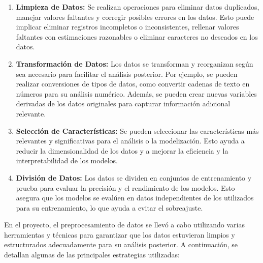 \documentclass[12pt]{article}
\begin{document}
\begin{enumerate}
    \item \textbf{Limpieza de Datos:} Se realizan operaciones para eliminar datos duplicados, manejar valores faltantes y corregir posibles errores en los datos. Esto puede implicar eliminar registros incompletos o inconsistentes, rellenar valores faltantes con estimaciones razonables o eliminar caracteres no deseados en los datos.
    \item \textbf{Transformación de Datos:} Los datos se transforman y reorganizan según sea necesario para facilitar el análisis posterior. Por ejemplo, se pueden realizar conversiones de tipos de datos, como convertir cadenas de texto en números para su análisis numérico. Además, se pueden crear nuevas variables derivadas de los datos originales para capturar información adicional relevante.
    \item \textbf{Selección de Características:} Se pueden seleccionar las características más relevantes y significativas para el análisis o la modelización. Esto ayuda a reducir la dimensionalidad de los datos y a mejorar la eficiencia y la interpretabilidad de los modelos.
    \item \textbf{División de Datos:} Los datos se dividen en conjuntos de entrenamiento y prueba para evaluar la precisión y el rendimiento de los modelos. Esto asegura que los modelos se evalúen en datos independientes de los utilizados para su entrenamiento, lo que ayuda a evitar el sobreajuste.
\end{enumerate}

En el proyecto, el preprocesamiento de datos se llevó a cabo utilizando varias herramientas y técnicas para garantizar que los datos estuvieran limpios y estructurados adecuadamente para su análisis posterior. A continuación, se detallan algunas de las principales estrategias utilizadas:
\end{document}
